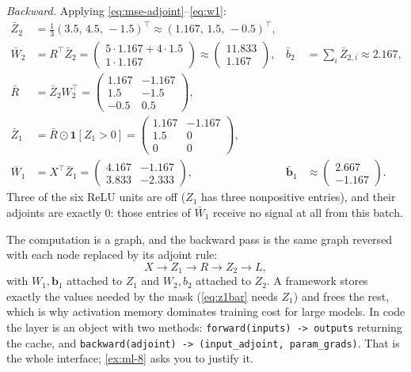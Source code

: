 \begin{example}
\emph{Backward.} Applying \eqref{eq:mse-adjoint}--\eqref{eq:w1}:
\begin{align*}
  \bar Z_2&=\tfrac13(3.5,\,4.5,\,-1.5)^{\!\top}\approx(1.167,\,1.5,\,-0.5)^{\!\top},\\
  \bar W_2&=R^{\!\top}\bar Z_2
   =\begin{pmatrix}5\cdot1.167+4\cdot1.5\\ 1\cdot1.167\end{pmatrix}
   \approx\begin{pmatrix}11.833\\1.167\end{pmatrix},
  & \bar b_2&=\textstyle\sum_i\bar Z_{2,i}\approx2.167,\\
  \bar R&=\bar Z_2W_2^{\!\top}=
   \begin{pmatrix}1.167&-1.167\\1.5&-1.5\\-0.5&0.5\end{pmatrix},\\
  \bar Z_1&=\bar R\odot\mathbf{1}[Z_1>0]=
   \begin{pmatrix}1.167&-1.167\\1.5&0\\0&0\end{pmatrix},\\
  \bar W_1&=X^{\!\top}\bar Z_1
   =\begin{pmatrix}4.167&-1.167\\3.833&-2.333\end{pmatrix},
  & \bar{\mathbf b}_1&\approx\begin{pmatrix}2.667\\-1.167\end{pmatrix}.
\end{align*}
Three of the six ReLU units are off ($Z_1$ has three nonpositive entries), and
their adjoints are exactly $0$: those entries of $\bar W_1$ receive no signal at
all from this batch.
\end{example}

\begin{remark}
The computation is a graph, and the backward pass is the same graph reversed
with each node replaced by its adjoint rule:
\[
  X\longrightarrow Z_1\longrightarrow R\longrightarrow Z_2\longrightarrow L,
\]
with $W_1,\mathbf{b}_1$ attached to $Z_1$ and $W_2,b_2$ attached to $Z_2$. A
framework stores exactly the values needed by the mask (\eqref{eq:z1bar} needs
$Z_1$) and frees the rest, which is why activation memory dominates training
cost for large models. In code the layer is an object with two methods:
\texttt{forward(inputs) -> outputs} returning the cache, and
\texttt{backward(adjoint) -> (input\_adjoint, param\_grads)}. That is the whole
interface; \cref{ex:ml-8} asks you to justify it.
\end{remark}

